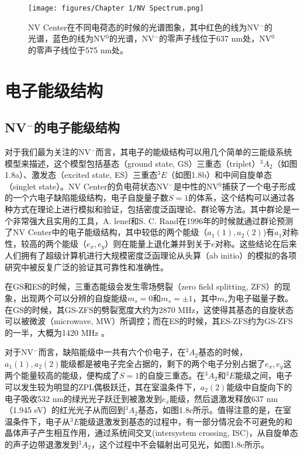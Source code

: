 \documentclass[type = bachelor]{whu-thesis}
\begin{document}
\begin{figure}
  \centering
  \texttt{[image: figures/Chapter 1/NV Spectrum.png]}
  \caption[NV Center在不同电荷态的时候的光谱图象]{NV Center在不同电荷态的时候的光谱图象，其中红色的线为NV$^-$的光谱，蓝色的线为NV$^0$的光谱，NV$^-$的零声子线位于637 nm处，NV$^0$的零声子线位于575 nm处。}
  \label{fig: NV Spectrum}
\end{figure}

\section{电子能级结构}

\subsection{NV$^-$的电子能级结构}
对于我们最为关注的NV$^-$而言，其电子的能级结构可以用几个简单的三能级系统模型来描述，这个模型包括基态（ground state, GS）三重态（triplet）$^3A_2$（如图1.8a）、激发态（excited state, ES）三重态$^3E$（如图1.8b）和中间自旋单态（singlet state）。NV Center的负电荷状态NV$^-$是中性的NV$^0$捕获了一个电子形成的一个六电子缺陷能级结构，电子自旋量子数$S=1$的体系，这个结构可以通过各种方式在理论上进行模拟和验证，包括密度泛函理论、群论等方法\cite{lenef1996electronic,goss1997comment, maze2011properties, hossain2008ab, gali2009theory}。其中群论是一个非常强大且实用的工具，A. lenef和S. C. Rand在1996年的时候就通过群论预测了NV Center中的电子能级结构，其中较低的两个能级（$a_1(1), a_2(2)$)有$a_1$对称性，较高的两个能级（$e_x, e_y$）则在能量上退化兼并到关于$e$对称\cite{lenef1996electronic}。这些结论在后来人们拥有了超级计算机进行大规模密度泛函理论从头算（ab initio）的模拟的各项研究中被反复广泛的验证其可靠性和准确性\cite{gali2009theory, zou2023influence}。

在GS和ES的时候，三重态能级会发生零场劈裂（zero field splitting, ZFS）的现象，出现两个可以分辨的自旋能级$m_s=0$和$m_s=±1$，其中$m_s$为电子磁量子数。在GS的时候，其GS-ZFS的劈裂宽度大约为2870 \unit{\MHz}，这使得其基态的自旋状态可以被微波（microwave, MW）所调控；而在ES的时候，其ES-ZFS约为GS-ZFS的一半，大概为1420 \unit{\MHz} \cite{gruber1997scanning,neumann2009excited}。

对于NV$^-$而言，缺陷能级中一共有六个价电子，在$^3A_2$基态的时候，$a_1(1), a_2(2)$能级都是被电子完全占据的，剩下的两个电子分别占据了$e_x, e_y$这两个能量较高的能级，便构成了$S=1$的自旋三重态。在$^3A_2$和$^3E$能级之间，电子可以发生较为明显的ZPL偶极跃迁，其在室温条件下，$a_2(2)$能级中自旋向下的电子吸收532 nm的绿光光子跃迁到被激发到$e_x$能级，然后退激发释放637 nm （1.945 \unit{\eV}）的红光光子从而回到$^3A_2$基态，如图1.8c所示。值得注意的是，在室温条件下，电子从$^3E$能级退激发到基态的过程中，有一部分情况会不可避免的和晶体声子产生相互作用，通过系统间交叉(intersystem crossing, ISC)，从自旋单态的声子边带退激发到$^3A_2$，这个过程中不会辐射出可见光，如图1.8c所示。
\end{document}
